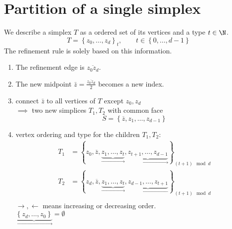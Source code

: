 \section{Partition of a single simplex}
\begin{definition}
	We describe a simplex $T$ as a ordered set of its vertices and a type $t\in \N$.
	\begin{equation*}
		T = \left\{z_{0}, \dots , z_{d}\right\}_{t}, \qquad t\in \left\{ 0,\dots ,d-1 \right\}
	\end{equation*}
	The refinement rule is solely based on this information.
	\begin{enumerate}[label = \arabic*)]
		\item The refinement edge is $\overline{z_{0}z_{d}}$.
		\item The new midpoint $\bar{z}= \frac{\overline{z_{0}z_{d}}}{2}$ becomes a new index.
		\item connect $\bar{z}$ to all vertices of $T$ except $z_{0},z_{d}$ \\
			$\implies$ two new simplices $T_{1},T_{2}$ with common face 
			 \begin{equation*}
				S = \left\{\overline{z},z_{1},\dots ,z_{d-1} \right\}
			\end{equation*}
		\item vertex ordering and type for the children $T_{1},T_{2}$:
			\begin{align*}
				T_{1}&= \left\{ z_{0},\overline{z},\underbrace{z_{1},\dots ,z_{t}}_{\rightarrow},\underbrace{z_{t+1},\dots ,z_{d-1}}_{{\rightarrow}} \right\}_{(t+1)\mod d}\\
				T_{2}&= \left\{ z_{d},\overline{z},\underbrace{z_{1},\dots ,z_{t}}_{\rightarrow},\underbrace{z_{d-1},\dots ,z_{t+1}}_{{\leftarrow}} \right\}_{(t+1)\mod d}\\
			\end{align*}
		$\rightarrow, \leftarrow$ means increasing or decreasing order.	\\
		$\underbrace{\left\{z_{d},\dots ,z_{0}\right\} }_{\rightarrow} =\emptyset$		
	\end{enumerate}
\end{definition}
